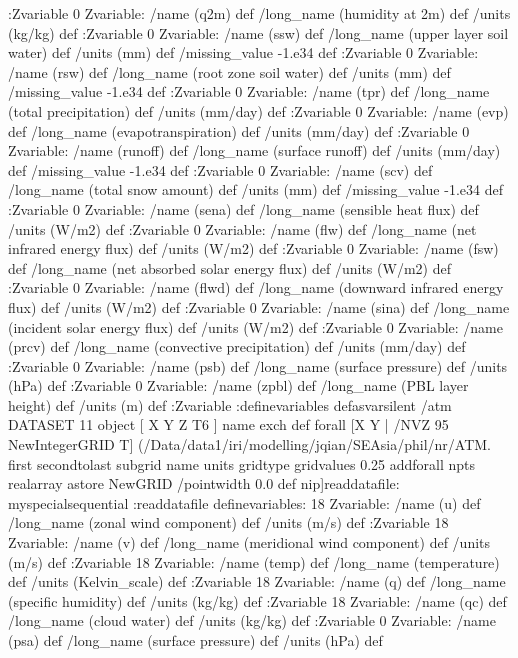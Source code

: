 \begin{ingrid}
{:Zvariable
0 Zvariable: /name (q2m) def /long_name (humidity at 2m)  def /units (kg/kg) def
:Zvariable
0 Zvariable: /name (ssw) def /long_name (upper layer soil water)  def /units (mm) def
/missing_value -1.e34 def
:Zvariable
0 Zvariable: /name (rsw) def /long_name (root zone soil water)  def /units (mm) def
/missing_value -1.e34 def
:Zvariable
0 Zvariable: /name (tpr) def /long_name (total precipitation)  def /units (mm/day) def
:Zvariable
0 Zvariable: /name (evp) def /long_name (evapotranspiration)  def /units (mm/day) def
:Zvariable
0 Zvariable: /name (runoff) def /long_name (surface runoff)  def /units (mm/day) def
/missing_value -1.e34 def
:Zvariable
0 Zvariable: /name (scv) def /long_name (total snow amount)  def /units (mm) def
/missing_value -1.e34 def
:Zvariable
0 Zvariable: /name (sena) def /long_name (sensible heat flux)  def /units (W/m2) def
:Zvariable
0 Zvariable: /name (flw) def /long_name (net infrared energy flux)  def /units (W/m2) def
:Zvariable
0 Zvariable: /name (fsw) def /long_name (net absorbed solar energy flux)  def /units (W/m2) def
:Zvariable
0 Zvariable: /name (flwd) def /long_name (downward infrared energy flux)  def /units (W/m2) def
:Zvariable
0 Zvariable: /name (sina) def /long_name (incident solar energy flux)  def /units (W/m2) def
:Zvariable
0 Zvariable: /name (prcv) def /long_name (convective precipitation)  def /units (mm/day) def
:Zvariable
0 Zvariable: /name (psb) def /long_name (surface pressure)  def /units (hPa) def
:Zvariable
0 Zvariable: /name (zpbl) def /long_name (PBL layer height)  def /units (m) def
:Zvariable
:definevariables
} defasvarsilent
/atm
{
DATASET 11 object
[ X Y Z T6 ] {  name exch def } forall
[X
    Y | 
/NVZ 95 NewIntegerGRID
    T] (/Data/data1/iri/modelling/jqian/SEAsia/phil/nr/ATM.%
        first secondtolast subgrid
        name units gridtype gridvalues
            {0.25 add}forall npts realarray astore
            NewGRID
         /pointwidth 0.0 def
         nip]readdatafile: 
myspecialsequential
:readdatafile
definevariables:
18 Zvariable: /name (u) def /long_name (zonal wind component) def /units (m/s) def
:Zvariable
18 Zvariable: /name (v) def /long_name (meridional wind component) def /units (m/s) def
:Zvariable
18 Zvariable: /name (temp) def /long_name (temperature) def /units (Kelvin_scale) def
:Zvariable
18 Zvariable: /name (q) def /long_name (specific humidity) def /units (kg/kg) def
:Zvariable
18 Zvariable: /name (qc) def /long_name (cloud water) def /units (kg/kg) def
:Zvariable
0 Zvariable: /name (psa) def /long_name (surface pressure)  def /units (hPa) def
}
\end{ingrid}
